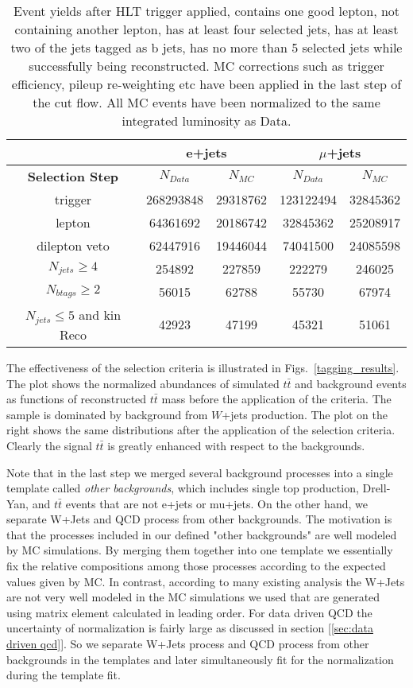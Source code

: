 \documentclass{cmspaperpdf}
\begin{document}
\begin{table}[h!]
\small
\centering
\begin{tabular}{|c | c  c | c  c|}
\hline
 & \multicolumn{2}{|c|}{e+jets}&\multicolumn{2}{|c|}{$\mu$+jets} \\
\hline
\textbf{Selection Step} & $N_{Data}$ & $N_{MC}$ & $N_{Data}$ & $N_{MC}$ \\
\hline
trigger & 268293848 & 29318762 & 123122494 & 32845362  \\
lepton & 64361692 & 20186742 & 32845362 & 25208917 \\ 
dilepton veto & 62447916 & 19446044 & 74041500 & 24085598  \\ 
$N_{jets}\geqslant4$ & 254892 & 227859 & 222279 & 246025  \\
$N_{btags}\geqslant2$ & 56015 & 62788 & 55730 & 67974  \\
$N_{jets}\leqslant5$ and kin Reco & 42923 & 47199 & 45321 & 51061  \\
\hline
\end{tabular}
\caption{\small Event yields after HLT trigger applied, contains one good lepton, not containing another lepton, has at least four selected jets, has at least two of the jets tagged as b jets, has no more than 5 selected jets while successfully being reconstructed. MC corrections such as trigger efficiency, pileup re-weighting etc have been applied in the last step of the cut flow. All MC events have been normalized to the same integrated luminosity as Data.}

\label{tab:cut-flow}
\end{table}

The effectiveness of the selection criteria is illustrated in Figs.~\ref{tagging_results}.  The plot shows the normalized abundances of simulated $t\bar t$ and background events as functions of reconstructed $t\bar t$ mass before the application of the criteria.  The sample is dominated by background from $W$+jets production.  The plot on the right shows the same distributions after the application of the selection criteria.  Clearly the signal $t\bar{t}$ is greatly enhanced with respect to the backgrounds.   

Note that in the last step we merged several background processes into a single template called {\it other backgrounds}, which includes single top production, Drell-Yan, and $t\bar{t}$ events that are not e+jets or mu+jets.  On the other hand, we separate W+Jets and QCD process from other backgrounds. The motivation is that the processes included in our defined "other backgrounds" are well modeled by MC simulations. By merging them together into one template we essentially fix the relative compositions among those processes according to the expected values given by MC.  In contrast, according to many existing analysis the W+Jets are not very well modeled in the MC simulations we used that are generated using matrix element calculated in leading order. For data driven QCD the uncertainty of normalization is fairly large as discussed in section [\ref{sec:data driven qcd}].  So we separate W+Jets process and QCD process from other backgrounds in the templates and later simultaneously fit for the normalization during the template fit.
\end{document}
